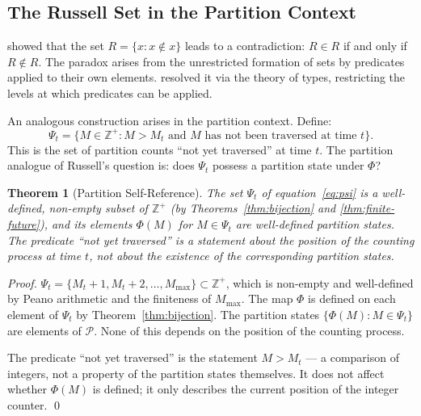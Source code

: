 \documentclass[twocolumn,10pt,a4paper]{article}
\theoremstyle{thmstyle}
\newtheorem{theorem}{Theorem}[section]
\theoremstyle{definition}
\theoremstyle{remark}
\newcommand{\Zp}{\mathbb{Z}^{+}}
\newcommand{\Parts}{\mathcal{P}}
\newcommand{\Mmax}{M_{\max}}
\newcommand{\PhiMap}{\varPhi}
\begin{document}
\subsection{The Russell Set in the Partition Context}

\citet{russell1903} showed that the set $R = \{x : x \notin x\}$ leads to a contradiction: $R \in R$ if and only if $R \notin R$. The paradox arises from the unrestricted formation of sets by predicates applied to their own elements. \citet{principia} resolved it via the theory of types, restricting the levels at which predicates can be applied.

An analogous construction arises in the partition context. Define:
\begin{equation}
    \Psi_t = \{ M \in \Zp : M > M_t \text{ and } M \text{ has not been traversed at time } t\}.
    \label{eq:psi}
\end{equation}
This is the set of partition counts ``not yet traversed'' at time $t$. The partition analogue of Russell's question is: does $\Psi_t$ possess a partition state under $\PhiMap$?

\begin{theorem}[Partition Self-Reference]
\label{thm:self-ref}
The set $\Psi_t$ of equation~\eqref{eq:psi} is a well-defined, non-empty subset of $\Zp$ (by Theorems~\ref{thm:bijection} and \ref{thm:finite-future}), and its elements $\PhiMap(M)$ for $M \in \Psi_t$ are well-defined partition states. The predicate ``not yet traversed'' is a statement about the position of the counting process at time $t$, not about the existence of the corresponding partition states.
\end{theorem}

\begin{proof}
$\Psi_t = \{M_t + 1, M_t + 2, \ldots, \Mmax\} \subset \Zp$, which is non-empty and well-defined by Peano arithmetic and the finiteness of $\Mmax$. The map $\PhiMap$ is defined on each element of $\Psi_t$ by Theorem~\ref{thm:bijection}. The partition states $\{\PhiMap(M) : M \in \Psi_t\}$ are elements of $\Parts$. None of this depends on the position of the counting process.

The predicate ``not yet traversed'' is the statement $M > M_t$ --- a comparison of integers, not a property of the partition states themselves. It does not affect whether $\PhiMap(M)$ is defined; it only describes the current position of the integer counter. \qed
\end{proof}
\end{document}
